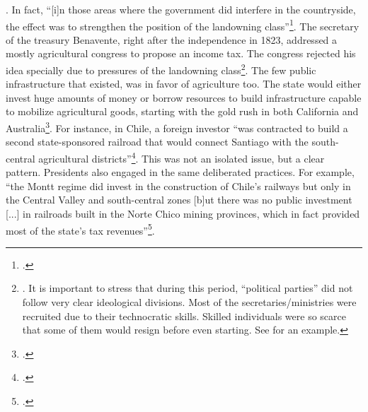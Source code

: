 \documentclass[onesided]{article}\usepackage[]{graphicx}\usepackage[]{color}
\begin{document}
{	}. In fact, ``[i]n those areas where the government did interfere in the countryside, the effect was to strengthen the position of the landowning class''\footnote{\citet[p. 118]{Bauer:2008kx}.}. The secretary of the treasury Benavente, right after the independence in 1823, addressed a mostly agricultural congress to propose an income tax. The congress rejected his idea specially due to pressures of the landowning class\footnote{\citet[p. 306]{Sagredo1997}. It is important to stress that during this period, ``political parties'' did not follow very clear ideological divisions. Most of the secretaries/ministries were recruited due to their technocratic skills. Skilled individuals were so scarce that some of them would resign before even starting. See \citet[p. 293-294]{Sagredo1997} for an example.}. The few public infrastructure that existed, was in favor of agriculture too. The state would either invest huge amounts of money or borrow resources to build infrastructure capable to mobilize agricultural goods, starting with the gold rush in both California and Australia\footnote{\citet[]{Rippy:1971rz,Marichal:1989bh, Zeitlin:1984aa,Bauer:2008kx}.}. For instance, in Chile, a foreign investor ``was contracted to build a second state-sponsored railroad that would connect Santiago with the south-central agricultural districts''\footnote{\citet[p. 85]{Rippy:1971rz}.}. This was not an isolated issue, but a clear  pattern. Presidents also engaged in the same deliberated practices. For example, ``the Montt regime did invest in the construction of Chile's railways but only in the Central Valley and south-central zones [b]ut there was no public investment [...] in railroads built in the Norte Chico mining provinces, which in fact provided most of the state's tax revenues''\footnote{\citet[p. 41]{Zeitlin:1984aa}.}. 
\end{document}
